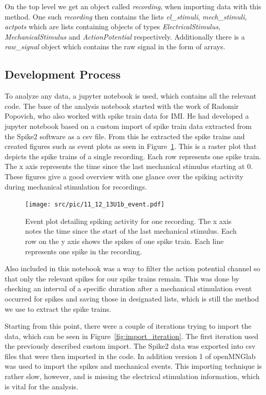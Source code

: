 On the top level we get an object called \textit{recording}, when importing data with this method. One such \textit{recording} then contains the lists \textit{el\_stimuli}, \textit{mech\_stimuli}, \textit{actpots} which are lists containing objects of types \textit{ElectricalStimulus}, \textit{MechanicalStimulus} and \textit{ActionPotential} respectively. Additionally there is a \textit{raw\_signal} object which contains the raw signal in the form of arrays.


\subsection{Development Process}
To analyze any data, a jupyter notebook is used, which contains all the relevant code. The base of the analysis notebook started with the work of Radomir Popovich, who also worked with spike train data for IMI. He had developed a jupyter notebook based on a custom import of spike train data extracted from the Spike2 software as a csv file. From this he extracted the spike trains and created figures such as event plots as seen in Figure~\ref{fig:eventplot}. This is a raster plot that depicts the spike trains of a single recording. Each row represents one spike train. The x axis represents the time since the last mechanical stimulus starting at 0. These figures give a good overview with one glance over the spiking activity during mechanical stimulation for recordings.
\begin{figure}
	\texttt{[image: src/pic/11\_12\_13U1b\_event.pdf]}
	\caption{Event plot detailing spiking activity for one recording. The x axis notes the time since the start of the last mechanical stimulus. Each row on the y axis shows the spikes of one spike train. Each line represents one spike in the recording.}
	\label{fig:eventplot}
\end{figure}
Also included in this notebook was a way to filter the action potential channel so that only the relevant spikes for our spike trains remain. This was done by checking an interval of a specific duration after a mechanical stimulation event occurred for spikes and saving those in designated lists, which is still the method we use to extract the spike trains.

Starting from this point, there were a couple of iterations trying to import the data, which can be seen in Figure~\ref{fig:import_iteration}. The first iteration used the previously described custom import. The Spike2 data was exported into csv files that were then imported in the code. In addition version 1 of openMNGlab was used to import the spikes and mechanical events. This importing technique is rather slow, however, and is missing the electrical stimulation information, which is vital for the analysis.


